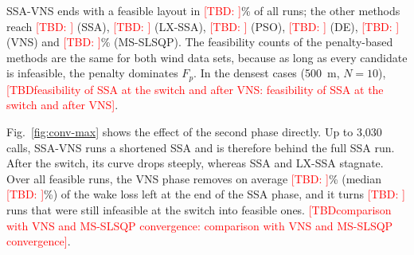 \documentclass[journal,twoside]{IEEEtran}
\newcommand{\TBD}[1]{\textcolor{red}{[TBD\ifx\relax#1\relax\else: #1\fi]}}
\begin{document}
SSA-VNS ends with a feasible layout in \TBD{}\% of all runs; the other methods reach \TBD{} (SSA), \TBD{} (LX-SSA), \TBD{} (PSO), \TBD{} (DE), \TBD{} (VNS) and \TBD{}\% (MS-SLSQP). The feasibility counts of the penalty-based methods are the same for both wind data sets, because as long as every candidate is infeasible, the penalty dominates $F_p$. In the densest cases (500~m, $N=10$), \TBD{feasibility of SSA at the switch and after VNS}.

Fig.~\ref{fig:conv-max} shows the effect of the second phase directly. Up to 3,030 calls, SSA-VNS runs a shortened SSA and is therefore behind the full SSA run. After the switch, its curve drops steeply, whereas SSA and LX-SSA stagnate. Over all feasible runs, the VNS phase removes on average \TBD{}\% (median \TBD{}\%) of the wake loss left at the end of the SSA phase, and it turns \TBD{} runs that were still infeasible at the switch into feasible ones. \TBD{comparison with VNS and MS-SLSQP convergence}.
\end{document}
